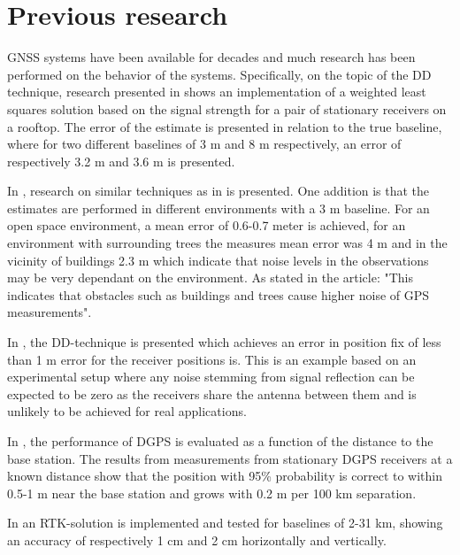 \section{Previous research}\label{previousResearch}
GNSS systems have been available for decades and much research has been performed on the behavior of the systems. Specifically, on the topic of the DD technique, research presented in \cite{BLUE} shows an implementation of a weighted least squares solution based on the signal strength for a pair of stationary receivers on a rooftop. The error of the estimate is presented in relation to the true baseline, where for two different baselines of 3 m and 8 m respectively, an error of respectively 3.2 m and 3.6 m is presented. 
\par 
In \cite{posAccuracyEnvironment}, research on similar techniques as in \cite{BLUE} is presented. One addition is that the estimates are performed in different environments with a 3 m baseline. For an open space environment, a mean error of 0.6-0.7 meter is achieved, for an environment with surrounding trees the measures mean error was 4 m and in the vicinity of buildings 2.3 m which indicate that noise levels in the observations may be very dependant on the environment. As stated in the article: "This indicates that obstacles such as buildings and trees cause higher noise of GPS measurements".
\par
In \cite{farrell1999global}, the DD-technique is presented which achieves an error in position fix of less than 1 m error for the receiver positions is. This is an example based on an experimental setup where any noise stemming from signal reflection can be expected to be zero as the receivers share the antenna between them and is unlikely to be achieved for real applications.
\par
In \cite{monteiro2005accuracy}, the performance of DGPS is evaluated as a function of the distance to the base station. The results from measurements from stationary DGPS receivers at a known distance show that the position with 95\% probability is correct to within 0.5-1 m near the base station and grows with 0.2 m per 100 km separation. 
\par
In \cite{feng2008gps} an RTK-solution is implemented and tested for baselines of 2-31 km, showing an accuracy of respectively 1 cm and 2 cm horizontally and vertically.

 
